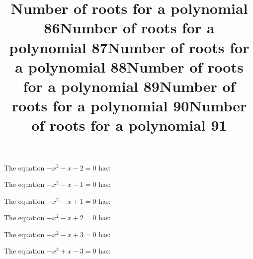 \documentclass{article}
\begin{document}
\begin{category}
\begin{question}[multichoice]


\end{question}
\begin{question}[multichoice]
\title{Number of roots for a polynomial 86}
The equation $- x^{2} - x - 2=0$ has:



\end{question}
\begin{question}[multichoice]
\title{Number of roots for a polynomial 87}
The equation $- x^{2} - x - 1=0$ has:



\end{question}
\begin{question}[multichoice]
\title{Number of roots for a polynomial 88}
The equation $- x^{2} - x + 1=0$ has:



\end{question}
\begin{question}[multichoice]
\title{Number of roots for a polynomial 89}
The equation $- x^{2} - x + 2=0$ has:



\end{question}
\begin{question}[multichoice]
\title{Number of roots for a polynomial 90}
The equation $- x^{2} - x + 3=0$ has:



\end{question}
\begin{question}[multichoice]
\title{Number of roots for a polynomial 91}
The equation $- x^{2} + x - 3=0$ has:




\end{question}
\end{category}
\end{document}
